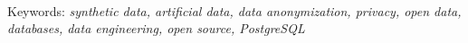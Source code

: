 \lipsum[3-5] \\
Keywords: \textit{synthetic data, artificial data, data anonymization, privacy, open data, databases, data engineering, open source, PostgreSQL}
